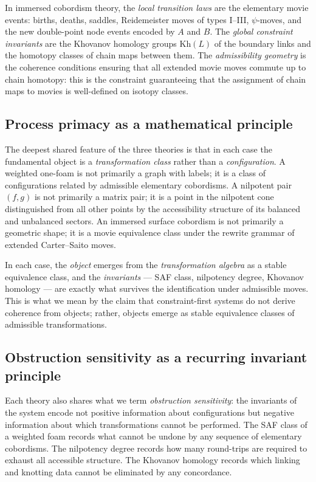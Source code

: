 \documentclass[12pt, a4paper]{article}
\theoremstyle{plain}
\theoremstyle{definition}
\theoremstyle{correspondence}
\newcommand{\Kh}{\mathrm{Kh}}
\begin{document}
In immersed cobordism theory, the \emph{local transition laws} are the elementary movie
events: births, deaths, saddles, Reidemeister moves of types I--III, $\psi$-moves, and
the new double-point node events encoded by $A$ and $B$. The \emph{global constraint
invariants} are the Khovanov homology groups $\Kh(L)$ of the boundary links and the
homotopy classes of chain maps between them. The \emph{admissibility geometry} is the
coherence conditions ensuring that all extended movie moves commute up to chain
homotopy: this is the constraint guaranteeing that the assignment of chain maps to
movies is well-defined on isotopy classes.

\subsection{Process primacy as a mathematical principle}

The deepest shared feature of the three theories is that in each case the fundamental
object is a \emph{transformation class} rather than a \emph{configuration}. A weighted
one-foam is not primarily a graph with labels; it is a class of configurations related
by admissible elementary cobordisms. A nilpotent pair $(f,g)$ is not primarily a
matrix pair; it is a point in the nilpotent cone distinguished from all other points
by the accessibility structure of its balanced and unbalanced sectors. An immersed
surface cobordism is not primarily a geometric shape; it is a movie equivalence class
under the rewrite grammar of extended Carter--Saito moves.

In each case, the \emph{object} emerges from the \emph{transformation algebra} as a
stable equivalence class, and the \emph{invariants} --- SAF class, nilpotency degree,
Khovanov homology --- are exactly what survives the identification under admissible
moves. This is what we mean by the claim that constraint-first systems do not derive
coherence from objects; rather, objects emerge as stable equivalence classes of
admissible transformations.

\subsection{Obstruction sensitivity as a recurring invariant principle}

Each theory also shares what we term \emph{obstruction sensitivity}: the invariants of
the system encode not positive information about configurations but negative information
about which transformations cannot be performed. The SAF class of a weighted foam
records what cannot be undone by any sequence of elementary cobordisms. The nilpotency
degree records how many round-trips are required to exhaust all accessible structure.
The Khovanov homology records which linking and knotting data cannot be eliminated by
any concordance.
\end{document}
